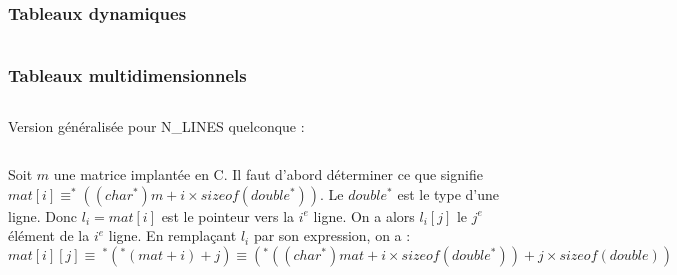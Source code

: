 \documentclass[../main.tex]{subfiles}
\begin{document}


\subsubsection{Tableaux dynamiques}
\inputminted{c}{solutions/nat2bin.c}
\subsubsection{Tableaux multidimensionnels}
\inputminted{c}{solutions/tab_display_2d.c}
\newline
Version généralisée pour \textsf{N\_LINES} quelconque : 
\inputminted{c}{solutions/triangle.c}
 \newline
Soit $m$ une matrice implantée en C. Il faut d'abord déterminer ce que signifie $mat[i] \equiv ^*((char^*)m + i\times sizeof(double^*))$. Le $double^*$ est le type d'une ligne. Donc $l_{i} = mat[i]$ est le pointeur vers la $i^{e}$ ligne. On a alors $l_{i}[j]$ le $j^e$ élément de la $i^e$ ligne. En remplaçant $l_{i}$ par son expression, on a :
$$mat[i][j] \equiv\ ^*(^*(mat + i) + j) \equiv (^*((char^*)mat + i\times sizeof(double^*)) + j\times sizeof(double)) $$
\inputminted{c}{solutions/matrix.c}
\end{document}
